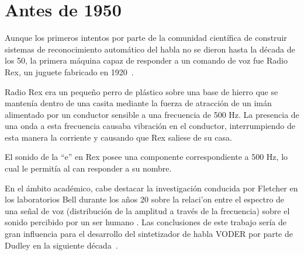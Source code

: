 \section{Antes de 1950}
\label{sec:pre50s}

Aunque los primeros intentos por parte de la comunidad cient\'{i}fica de construir sistemas de reconocimiento autom\'{a}tico del habla no se dieron hasta la d\'{e}cada de los 50, la primera m\'{a}quina capaz de responder
a un comando de voz fue Radio Rex, un juguete fabricado en \mbox{1920 \cite{AnusuyaSpeech2009}}.

Radio Rex era un peque\~{n}o perro de pl\'{a}stico sobre una base de hierro que se manten\'{i}a dentro de una casita
mediante la fuerza de atracci\'{o}n de un im\'{a}n alimentado por un conductor sensible a una frecuencia de 500 Hz.
La presencia de una onda a esta frecuencia causaba vibraci\'{o}n en el conductor, interrumpiendo de
esta manera la corriente y causando que Rex saliese de su casa. 

El sonido de la ``e'' en Rex posee una componente correspondiente a 500 Hz, lo cual le permit\'{i}a al can responder a su nombre.

En el \'{a}mbito acad\'{e}mico, cabe destacar la investigaci\'{o}n conducida por Fletcher en los laboratorios Bell
durante los a\~{n}os 20 sobre la relaci'{o}n entre el espectro de una se\~{n}al de voz (distribuci\'{o}n de 
la amplitud a trav\'{e}s de la frecuencia) sobre el sonido percibido por un ser humano \cite{FletcherNature1922}. 
Las conclusiones de este trabajo ser\'{i}a de gran influencia para el desarrollo del sintetizador de habla VODER por parte de Dudley en la siguiente \mbox{d\'{e}cada \cite{JuangAutomaticSpeech}}. 
